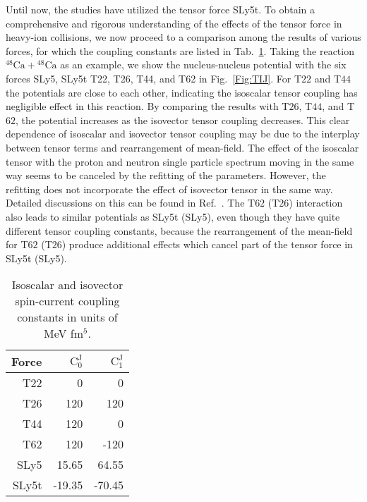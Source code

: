 \documentclass[aps,prc,twocolumn,showpacs,superscriptaddress,longbibliography,nofootinbib,floatfix,10pt]{revtex4-1}
\begin{document}
Until now, the studies have utilized the tensor force SLy5t.
To obtain a comprehensive and rigorous understanding of the effects of the tensor force in heavy-ion collisions,
we now proceed to a comparison among the results of various forces, for which the coupling constants
are listed in Tab.~\ref{tab:CC}. Taking the reaction $^{48}\mathrm{Ca}+\mathrm{^{48}Ca}$ as an example,
we show the nucleus-nucleus potential with the six forces SLy5, SLy5t T22, T26, T44, and T62 in Fig.~\ref{Fig:TIJ}.
For T$22$ and T$44$ the potentials are close to each other, indicating the isoscalar tensor coupling has
negligible effect in this reaction. By comparing the results with T$26$, T$44$, and T$62$, the potential increases as the isovector tensor
coupling decreases. This clear dependence of isoscalar and isovector tensor coupling may be due to the interplay between tensor terms
and rearrangement of mean-field. The effect of the isoscalar tensor with the proton and neutron single particle spectrum moving
in the same way seems to be canceled by the refitting of the parameters.
However, the refitting does not incorporate the effect of isovector tensor in the same way.
Detailed discussions on this can be found in Ref.~\cite{Guo2018_PLB782-401}.
The T$62$ (T$26$) interaction also leads to similar potentials as SLy5t (SLy5), even though they have quite different tensor coupling constants,
because the rearrangement of the mean-field for T$62$ (T$26$)
produce additional effects which cancel part of the tensor force in SLy5t (SLy5).
\begin{table}
\caption{Isoscalar and isovector spin-current coupling constants in units of MeV fm$^5$.}
\label{tab:CC}
\begin{center}
\begin{tabular*}{0.4\textwidth}{@{\extracolsep{\fill}}rrr}
\hline\hline
Force & $\mathrm{C}^\mathrm{J}_0$ & $\mathrm{C}^\mathrm{J}_1$  \\
\hline
T22   &     0   &      0   \\
T26   &   120   &    120   \\
T44   &   120   &      0   \\
T62   &   120   &   -120   \\
SLy5  &  15.65  &    64.55  \\
SLy5t & -19.35  &   -70.45  \\
\hline \hline
\end{tabular*}
\end{center}
\end{table}
\end{document}
